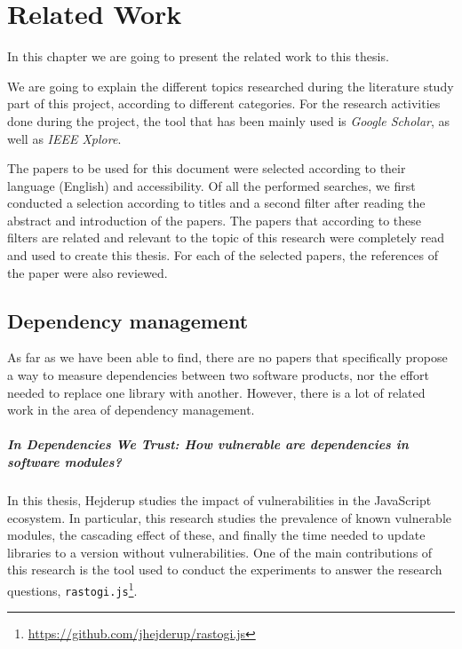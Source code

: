 \chapter{Related Work}\label{ch:RelatedWork}
In this chapter we are going to present the related work to this thesis.

We are going to explain the different topics researched during the literature study part of this project, according to different categories.
For the research activities done during the project, the tool that has been mainly used is \textit{Google Scholar}, as well as \textit{IEEE Xplore}.

\blankl
The papers to be used for this document were selected according to their language (English) and accessibility. Of all the performed searches, we first conducted a selection according to titles and a second filter after reading the abstract and introduction of the papers.
The papers that according to these filters are related and relevant to the topic of this research were completely read and used to create this thesis. For each of the selected papers, the references of the paper were also reviewed.

\section{Dependency management}

As far as we have been able to find, there are no papers that specifically propose a way to measure dependencies between two software products, nor the effort needed to replace one library with another. However, there is a lot of related work in the area of dependency management.

\paragraph{In Dependencies We Trust: How vulnerable are dependencies in software modules? \cite{hejderup2015dependencies}}
In this thesis, Hejderup studies the impact of vulnerabilities in the JavaScript ecosystem. In particular, this research studies the prevalence of known vulnerable modules, the cascading effect of these, and finally the time needed to update libraries to a version without vulnerabilities.
One of the main contributions of this research is the tool used to conduct the experiments to answer the research questions, \texttt{rastogi.js}\footnote{\href{https://github.com/jhejderup/rastogi.js}{https://github.com/jhejderup/rastogi.js}}.


